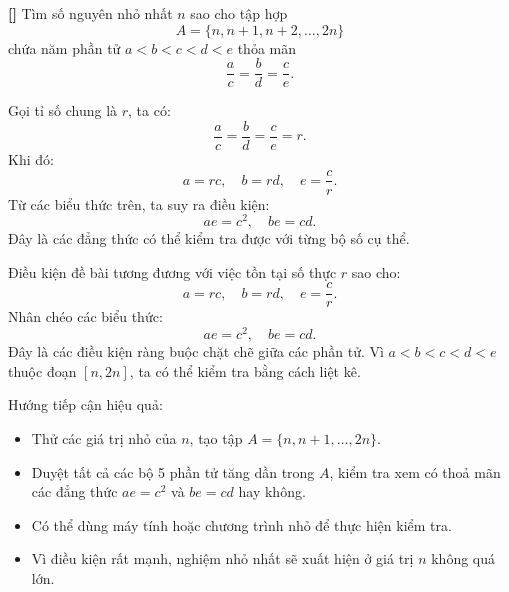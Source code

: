 \documentclass[../04-diophantine-equations.tex]{subfiles}
\begin{document}
\begin{exercise*}\label{example:ROU-2014-MO-G8-P3}\textbf{[]}
    Tìm số nguyên nhỏ nhất \( n \) sao cho tập hợp 
    \[
        A = \{n, n + 1, n + 2, \ldots, 2n\}
    \]
    chứa năm phần tử \( a < b < c < d < e \) thỏa mãn
    \[
        \frac{a}{c} = \frac{b}{d} = \frac{c}{e}.
    \]
\end{exercise*}

\begin{remark*}
    Gọi tỉ số chung là \( r \), ta có:
    \[
        \frac{a}{c} = \frac{b}{d} = \frac{c}{e} = r.
    \]
    Khi đó:
    \[
        a = rc,\quad b = rd,\quad e = \frac{c}{r}.
    \]
    Từ các biểu thức trên, ta suy ra điều kiện:
    \[
        ae = c^2,\quad be = cd.
    \]
    Đây là các đẳng thức có thể kiểm tra được với từng bộ số cụ thể.
\end{remark*}

\begin{story*}
    Điều kiện đề bài tương đương với việc tồn tại số thực \( r \) sao cho:
    \[
        a = rc,\quad b = rd,\quad e = \frac{c}{r}.
    \]
    Nhân chéo các biểu thức:
    \[
        ae = c^2,\quad be = cd.
    \]
    Đây là các điều kiện ràng buộc chặt chẽ giữa các phần tử. Vì \( a < b < c < d < e \) thuộc đoạn \( [n, 2n] \), ta có thể kiểm tra bằng cách liệt kê.

    Hướng tiếp cận hiệu quả:
    \begin{itemize}[topsep=0pt, partopsep=0pt, itemsep=0pt]
        \item Thử các giá trị nhỏ của \( n \), tạo tập \( A = \{n, n+1, \ldots, 2n\} \).
        \item Duyệt tất cả các bộ 5 phần tử tăng dần trong \( A \), kiểm tra xem có thoả mãn các đẳng thức \( ae = c^2 \) và \( be = cd \) hay không.
        \item Có thể dùng máy tính hoặc chương trình nhỏ để thực hiện kiểm tra.
        \item Vì điều kiện rất mạnh, nghiệm nhỏ nhất sẽ xuất hiện ở giá trị \( n \) không quá lớn.
    \end{itemize}
\end{story*}
\end{document}
